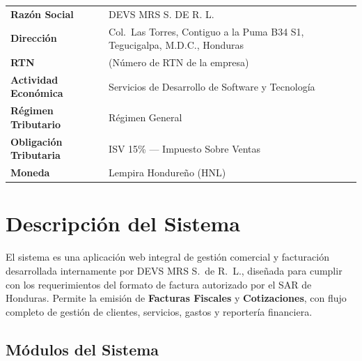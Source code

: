 \documentclass[12pt, letterpaper]{article}
\begin{document}
\begin{tabularx}{\linewidth}{>{\bfseries}lX}
  \toprule
  Razón Social          & DEVS MRS S. DE R. L.                              \\
  Dirección             & Col.\ Las Torres, Contiguo a la Puma B34 S1,
                          Tegucigalpa, M.D.C., Honduras                      \\
  RTN                   & (Número de RTN de la empresa)                     \\
  Actividad Económica   & Servicios de Desarrollo de Software y Tecnología  \\
  Régimen Tributario    & Régimen General                                   \\
  Obligación Tributaria & ISV 15\% --- Impuesto Sobre Ventas                \\
  Moneda                & Lempira Hondureño (HNL)                           \\
  \bottomrule
\end{tabularx}

\section{Descripción del Sistema}

El sistema es una aplicación web integral de gestión comercial y facturación
desarrollada internamente por DEVS MRS S.\ de R.\ L., diseñada para cumplir
con los requerimientos del formato de factura autorizado por el SAR de Honduras.
Permite la emisión de \textbf{Facturas Fiscales} y \textbf{Cotizaciones},
con flujo completo de gestión de clientes, servicios, gastos y reportería
financiera.

\subsection{Módulos del Sistema}
\end{document}
